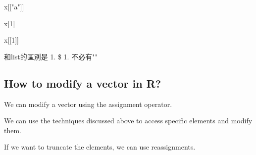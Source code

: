 \documentclass[]{book}
\newenvironment{Shaded}{\begin{snugshade}}{\end{snugshade}}
\newcommand{\DataTypeTok}[1]{\textcolor[rgb]{0.13,0.29,0.53}{#1}}
\newcommand{\DecValTok}[1]{\textcolor[rgb]{0.00,0.00,0.81}{#1}}
\newcommand{\KeywordTok}[1]{\textcolor[rgb]{0.13,0.29,0.53}{\textbf{#1}}}
\newcommand{\NormalTok}[1]{#1}
\newcommand{\OperatorTok}[1]{\textcolor[rgb]{0.81,0.36,0.00}{\textbf{#1}}}
\newcommand{\StringTok}[1]{\textcolor[rgb]{0.31,0.60,0.02}{#1}}
\theoremstyle{definition}
\theoremstyle{definition}
\theoremstyle{definition}
\theoremstyle{remark}
\begin{document}
\begin{Shaded}
\begin{Highlighting}[]
\NormalTok{x[[}\StringTok{"a"}\NormalTok{]]}
\end{Highlighting}
\end{Shaded}

\begin{Shaded}
\begin{Highlighting}[]
\NormalTok{x[}\DecValTok{1}\NormalTok{]}
\end{Highlighting}
\end{Shaded}

\begin{Shaded}
\begin{Highlighting}[]
\NormalTok{x[[}\DecValTok{1}\NormalTok{]]}
\end{Highlighting}
\end{Shaded}

和list的區別是 1. \$ 1. 不必有""

\begin{Shaded}
\end{Shaded}

\hypertarget{how-to-modify-a-vector-in-r}{%
\subsection{How to modify a vector in
R?}\label{how-to-modify-a-vector-in-r}}

We can modify a vector using the assignment operator.

We can use the techniques discussed above to access specific elements
and modify them.

If we want to truncate the elements, we can use reassignments.
\end{document}
